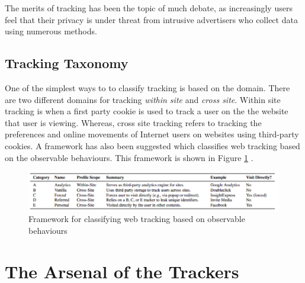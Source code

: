 \documentclass{article}
\begin{document}
The merits of tracking has been the topic of much debate, as increasingly users feel that their privacy is under threat from intrusive advertisers who collect data using numerous methods. 

\subsection{Tracking Taxonomy}
One of the simplest ways to to classify tracking is based on the domain. There are two different domains for tracking \textit{within site} and \textit{cross site}. Within site tracking is when a first party cookie is used to track a user on the the website that user is viewing. Whereas, cross site tracking refers to tracking the preferences and online movements of Internet users on websites using third-party cookies. A framework has also been suggested which classifies web tracking based on the observable behaviours. This framework is shown in Figure \ref{fig:TAframework}  \parencite{roesner}. 

\begin{figure}[H]
    \centering
    \includegraphics[width=1\textwidth]{TAframework}
    \caption{Framework for classifying web tracking based on observable behaviours \parencite{roesner}}
    \label{fig:TAframework}
\end{figure}

\section{The Arsenal of the Trackers}
\end{document}
